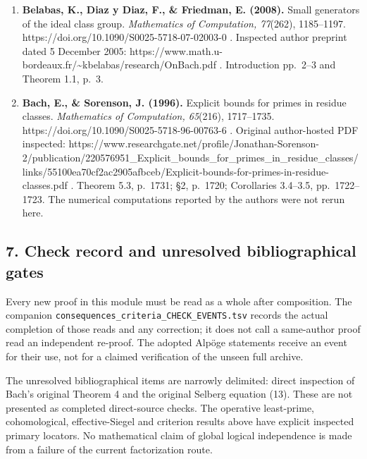 \begin{enumerate}
  . Original PDF inspected. The theorem's explicit absence of an RH
  assumption was checked.
\item
  \textbf{Belabas, K., Diaz y Diaz, F., \& Friedman, E. (2008).} Small
  generators of the ideal class group. \emph{Mathematics of Computation,
  77}(262), 1185--1197. https://doi.org/10.1090/S0025-5718-07-02003-0 .
  Inspected author preprint dated 5 December 2005:
  https://www.math.u-bordeaux.fr/\textasciitilde kbelabas/research/OnBach.pdf
  . Introduction pp.~2--3 and Theorem 1.1, p.~3.
\item
  \textbf{Bach, E., \& Sorenson, J. (1996).} Explicit bounds for primes
  in residue classes. \emph{Mathematics of Computation, 65}(216),
  1717--1735. https://doi.org/10.1090/S0025-5718-96-00763-6 . Original
  author-hosted PDF inspected:
  https://www.researchgate.net/profile/Jonathan-Sorenson-2/publication/220576951\_Explicit\_bounds\_for\_primes\_in\_residue\_classes/links/55100ea70cf2ac2905afbceb/Explicit-bounds-for-primes-in-residue-classes.pdf
  . Theorem 5.3, p.~1731; §2, p.~1720; Corollaries 3.4--3.5,
  pp.~1722--1723. The numerical computations reported by the authors
  were not rerun here.
\end{enumerate}

\subsection{7. Check record and unresolved bibliographical
gates}\label{check-record-and-unresolved-bibliographical-gates}

Every new proof in this module must be read as a whole after
composition. The companion
\texttt{consequences\_criteria\_CHECK\_EVENTS.tsv} records the actual
completion of those reads and any correction; it does not call a
same-author proof read an independent re-proof. The adopted Alpöge
statements receive an event for their use, not for a claimed
verification of the unseen full archive.

The unresolved bibliographical items are narrowly delimited: direct
inspection of Bach's original Theorem 4 and the original Selberg
equation (13). These are not presented as completed direct-source
checks. The operative least-prime, cohomological, effective-Siegel and
criterion results above have explicit inspected primary locators. No
mathematical claim of global logical independence is made from a failure
of the current factorization route.
